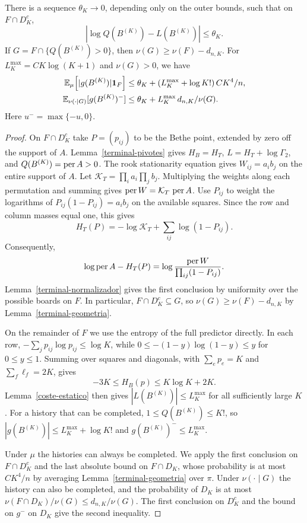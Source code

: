 \begin{proposicion}\label{terminal-error}
There is a sequence $\theta_K\to0$, depending only on the outer bounds, such that on $F\cap D_K^c$,
\[
 |\log Q(B^{(K)})-L(B^{(K)})|\le\theta_K .
\]
If $G=F\cap\{Q(B^{(K)})>0\}$, then $\nu(G)\ge\nu(F)-d_{n,K}$. For $L_K^{\max}=C K\log(K+1)$
and $\nu(G)>0$, we have
\[
 \begin{aligned}
 \mathbb{E}_\mu\!\left[|g(B^{(K)})|\mathbf1_F\right]
 &\le\theta_K+(L_K^{\max}+\log K!)\, CK^4/n,\\
 \mathbb{E}_{\nu(\cdot\mid G)}[g(B^{(K)})^-]
 &\le\theta_K+L_K^{\max}\,d_{n,K}/\nu(G).
 \end{aligned}
\]
Here $u^-=\max\{-u,0\}$.
\end{proposicion}
\begin{proof}
On $F\cap D_K^c$ take $P=(p_{ij})$ to be the Bethe point, extended by zero off the support of
$A$. Lemma~\ref{terminal-pivotes} gives $H_B=H_T$, $L=H_T+\log\Gamma_2$, and $Q(B^{(K)})=\operatorname{per} A>0$.
The rook stationarity equation gives $W_{ij}=a_i b_j$ on the entire support of $A$. Let
$\mathcal K_T=\prod_i a_i\prod_j b_j$. Multiplying the weights along each permutation and summing
gives $\operatorname{per} W=\mathcal K_T\,\operatorname{per} A$. Use $P_{ij}$ to weight the logarithms of
$P_{ij}(1-P_{ij})=a_i b_j$ on the available squares. Since the row
and column masses equal one, this gives
\[
 H_T(P)=-\log\mathcal K_T+\sum_{ij}\log(1-P_{ij}).
\]
Consequently,
\[
 \log\operatorname{per} A-H_T(P)
 =\log\frac{\operatorname{per} W}{\prod_{ij}(1-P_{ij})}.
\]
Lemma~\ref{terminal-normalizador} gives the first conclusion by uniformity over the possible boards
on $F$. In particular, $F\cap D_K^c\subseteq G$, so $\nu(G)\ge\nu(F)-d_{n,K}$ by
Lemma~\ref{terminal-geometria}.

On the remainder of $F$ we use the entropy of the full predictor directly. In each row,
$-\sum_j p_{ij}\log p_{ij}\le\log K$, while $0\le -(1-y)\log(1-y)\le y$ for $0\le y\le1$.
Summing over squares and diagonals, with $\sum_e p_e=K$ and $\sum_f\ell_f=2K$, gives
\[
 -3K\le H_B(p)\le K\log K+2K .
\]
Lemma~\ref{coste-estatico} then gives $|L(B^{(K)})|\le L_K^{\max}$ for all sufficiently large $K$.
For a history that can be completed, $1\le Q(B^{(K)})\le K!$, so $|g(B^{(K)})|\le L_K^{\max}+\log K!$
and $g(B^{(K)})^-\le L_K^{\max}$.

Under $\mu$ the histories can always be completed. We apply the first conclusion on $F\cap D_K^c$
and the last absolute bound on $F\cap D_K$, whose probability is at most $CK^4/n$ by averaging
Lemma~\ref{terminal-geometria} over $\pi$. Under $\nu(\cdot\mid G)$ the history can also be
completed, and the probability of $D_K$ is at most $\nu(F\cap D_K)/\nu(G)\le d_{n,K}/\nu(G)$.
The first conclusion on $D_K^c$ and the bound on $g^-$ on $D_K$ give the second inequality.
\end{proof}
